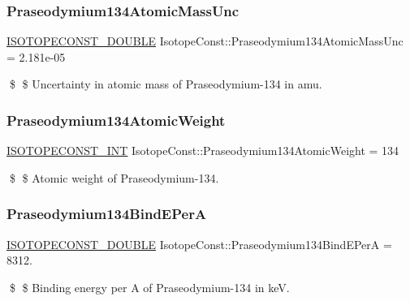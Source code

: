 \subsubsection{\texorpdfstring{Praseodymium134\+Atomic\+Mass\+Unc}{Praseodymium134AtomicMassUnc}}
{\footnotesize\ttfamily \mbox{\hyperlink{group___isotope_const-_macros_ga8f45a7272ce02c0b4c65c44636ed719a}{I\+S\+O\+T\+O\+P\+E\+C\+O\+N\+S\+T\+\_\+\+D\+O\+U\+B\+LE}} Isotope\+Const\+::\+Praseodymium134\+Atomic\+Mass\+Unc = 2.\+181e-\/05}

\$ \$ Uncertainty in atomic mass of Praseodymium-\/134 in amu. \mbox{\label{group___isotope_const-_praseodymium-_pr134_gad0b3c47fc11ea485da22955c45377c3c}} 
\subsubsection{\texorpdfstring{Praseodymium134\+Atomic\+Weight}{Praseodymium134AtomicWeight}}
{\footnotesize\ttfamily \mbox{\hyperlink{group___isotope_const-_macros_ga5f18360b3e99483a35c32d789e62621c}{I\+S\+O\+T\+O\+P\+E\+C\+O\+N\+S\+T\+\_\+\+I\+NT}} Isotope\+Const\+::\+Praseodymium134\+Atomic\+Weight = 134}

\$ \$ Atomic weight of Praseodymium-\/134. \mbox{\label{group___isotope_const-_praseodymium-_pr134_gaf194bfcaf49699f3533844b66d8f05b5}} 
\subsubsection{\texorpdfstring{Praseodymium134\+Bind\+E\+PerA}{Praseodymium134BindEPerA}}
{\footnotesize\ttfamily \mbox{\hyperlink{group___isotope_const-_macros_ga8f45a7272ce02c0b4c65c44636ed719a}{I\+S\+O\+T\+O\+P\+E\+C\+O\+N\+S\+T\+\_\+\+D\+O\+U\+B\+LE}} Isotope\+Const\+::\+Praseodymium134\+Bind\+E\+PerA = 8312.}

\$ \$ Binding energy per A of Praseodymium-\/134 in keV. \mbox{\label{group___isotope_const-_praseodymium-_pr134_gaba54d96facd3655084e2ed85bfe56bea}} 
